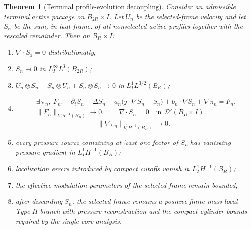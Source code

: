\documentclass[11pt]{amsart}
\theoremstyle{plain}
\newtheorem{theorem}{Theorem}[section]
\theoremstyle{definition}
\theoremstyle{remark}
\begin{document}
\begin{theorem}[Terminal profile-evolution decoupling]\label{thm:terminal-decoupling}
Consider an admissible terminal active package on \(B_{2R}\times I\).  Let
\(U_n\) be the selected-frame velocity and let \(S_n\) be the sum, in that
frame, of all nonselected active profiles together with the rescaled remainder.
Then on \(B_R\times I\):
\begin{enumerate}[label=\textup{(\roman*)}]
\item \(\nabla\cdot S_n=0\) distributionally;
\item \(S_n\to0\) in \(L^\infty_I L^3(B_{2R})\);
\item \(U_n\otimes S_n+S_n\otimes U_n+S_n\otimes S_n\to0\) in
\(L^1_I L^{3/2}(B_R)\);
\item
\[
  \begin{aligned}
  &\exists\,\pi_n,\ F_n:\quad
  \partial_t S_n-\Delta S_n
  +a_n\bigl(y\cdot\nabla S_n + S_n\bigr)
  +b_n\cdot\nabla S_n+\nabla\pi_n =F_n,\\
  &\|F_n\|_{L^1_IH^{-1}(B_R)}\to0,\qquad
  \nabla\cdot S_n=0\quad\text{in }\mathcal D'(B_R\times I).
  \end{aligned}
\]
\[
  \|\nabla\pi_n\|_{L^1_IH^{-1}(B_R)}\to0.
\]
\item every pressure source containing at least one factor of \(S_n\) has
vanishing pressure gradient in \(L^1_IH^{-1}(B_R)\);
\item localization errors introduced by compact cutoffs vanish in
\(L^1_IH^{-1}(B_R)\);
\item the effective modulation parameters of the selected frame remain bounded;
\item after discarding \(S_n\), the selected frame remains a positive finite-mass
local Type II branch with pressure reconstruction and the compact-cylinder
bounds required by the single-core analysis.
\end{enumerate}
\end{theorem}
\end{document}
